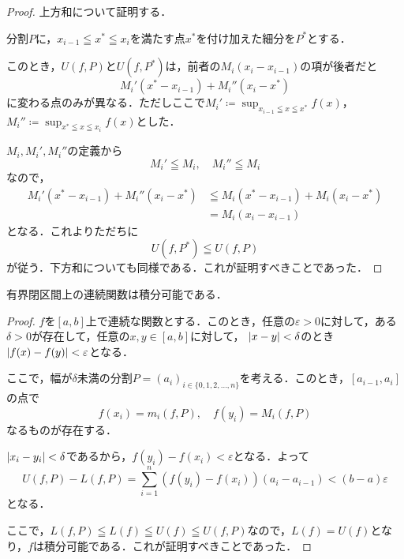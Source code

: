 \begin{tleftbar}
  \begin{proof}
    上方和について証明する．

    分割$P$に，$x_{i-1} \leqq x^{\ast} \leqq x_i$を満たす点$x^{\ast}$を付け加えた細分を$P^{\ast}$とする．

    このとき，$U(f,P)$と$U(f,P^{\ast})$は，前者の$M_i (x_i-x_{i-1})$の項が後者だと
    \[
      M_i ' (x^{\ast}-x_{i-1}) +M_i '' (x_i-x^{\ast})
    \]
    に変わる点のみが異なる．ただしここで$M_i ' \coloneqq \sup_{x_{i-1} \leqq x \leqq x^{\ast}} f(x)$，
    $M_i '' \coloneqq \sup_{x^\ast \leqq x \leqq  x_i} f(x)$とした．

    $M_i,M_i ',M_i ''$の定義から
    \[
      M_i ' \leqq M_i , \quad M_i '' \leqq M_i
    \]
    なので，
    \begin{align*}
      M_i ' (x^{\ast}-x_{i-1}) +M_i '' (x_i-x^{\ast}) &\leqq M_i (x^{\ast}-x_{i-1}) + M_i(x_i -x^{\ast}) \\
      & = M_i (x_i - x_{i-1})
    \end{align*}
    となる．これよりただちに
    \[
      U(f,P^\ast) \leqq U(f,P)
    \]
    が従う．下方和についても同様である．これが証明すべきことであった．
  \end{proof}
\end{tleftbar}

\begin{prop}{}{}
  有界閉区間上の連続関数は積分可能である．
\end{prop}

\begin{tleftbar}
  \begin{proof}
    $f$を$[a,b]$上で連続な関数とする．このとき，任意の$\varepsilon >0$に対して，ある$\delta >0$が存在して，任意の$x,y \in [a,b]$に対して，
    $\lvert x-y\rvert<\delta$のとき$\lvert f(x)-f(y)\rvert<\varepsilon$となる．

    ここで，幅が$\delta$未満の分割$P=(a_i)_{i \in \{0,1,2,\ldots,n \}}$を考える．このとき，$[a_{i-1},a_i]$の点で
    \[
      f(x_i)=m_i (f,P),\quad f(y_i)=M_i (f,P)
    \]
    なるものが存在する．

    $\lvert x_i-y_i\rvert< \delta$であるから，$f(y_i)-f(x_i)<\varepsilon$となる．よって
    \[
      U(f,P)-L(f,P) = \sum_{i=1}^{n} ( f(y_i)-f(x_i) ) (a_i-a_{i-1}) <(b-a)\varepsilon
    \]
    となる．

    ここで，$L(f,P) \leqq L(f) \leqq U(f) \leqq U(f,P)$なので，$L(f)=U(f)$となり，$f$は積分可能である．これが証明すべきことであった．
  \end{proof}
\end{tleftbar}

